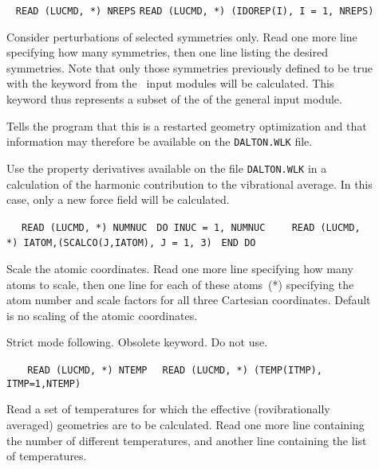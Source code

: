 \begin{description}
\item[]\verb| |\newline
\verb|READ (LUCMD, *) NREPS|\newline
\verb|READ (LUCMD, *) (IDOREP(I), I = 1, NREPS)|

Consider perturbations of selected
symmetries only.  Read one more line specifying how many
symmetries, then one line listing the desired symmetries. Note that
only those symmetries previously defined to be true with the keyword
 from the \aba\ input modules will be calculated. This
keyword thus represents a subset of the  of the general
input module.

\item[] Tells the program that this is a restarted
geometry optimization and that
information may therefore be available
on the \verb|DALTON.WLK| file.

\item[] Use the property derivatives available on the file 
\verb|DALTON.WLK| in a calculation of the harmonic contribution to the
vibrational average. In this case, only a new force field will be calculated.

\item[]\verb| |\newline
\verb| READ (LUCMD, *) NUMNUC|\newline
\verb| DO INUC = 1, NUMNUC|\newline
\verb|    READ (LUCMD, *) IATOM,(SCALCO(J,IATOM), J = 1, 3)|\newline
\verb| END DO|

Scale the atomic coordinates.  Read one more
line specifying how many atoms to scale, then one line for
each of these atoms~(*) specifying the atom number and scale
factors for all three Cartesian coordinates. Default is no scaling of
the atomic coordinates.

\item[] Strict mode following. Obsolete keyword. Do not use.

\item[]\verb| |\newline
\verb|  READ (LUCMD, *) NTEMP|
\verb|  READ (LUCMD, *) (TEMP(ITMP), ITMP=1,NTEMP)|

Read a set of temperatures for which the
effective (rovibrationally averaged) geometries are to be
calculated. Read one more line containing the number of different
temperatures, and another line containing the list of temperatures.


\end{description}
